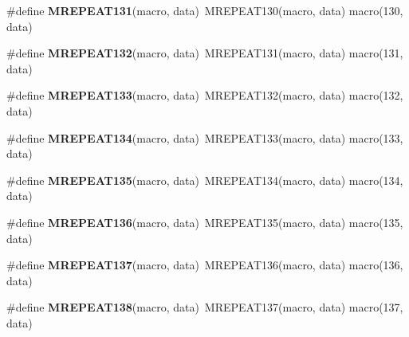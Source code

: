 \begin{DoxyCompactItemize}
\item 
\hypertarget{group__group__xmega__utils__mrepeat_ga6171f95e704d4bc6b92bca58bf15445c}{\#define {\bfseries M\-R\-E\-P\-E\-A\-T131}(macro, data)~M\-R\-E\-P\-E\-A\-T130(macro, data)   macro(130, data)}\label{group__group__xmega__utils__mrepeat_ga6171f95e704d4bc6b92bca58bf15445c}

\item 
\hypertarget{group__group__xmega__utils__mrepeat_ga70b3e029b2ca5370d287a710ba66cba3}{\#define {\bfseries M\-R\-E\-P\-E\-A\-T132}(macro, data)~M\-R\-E\-P\-E\-A\-T131(macro, data)   macro(131, data)}\label{group__group__xmega__utils__mrepeat_ga70b3e029b2ca5370d287a710ba66cba3}

\item 
\hypertarget{group__group__xmega__utils__mrepeat_ga808576086998ab3ae33981a5b7a28c4c}{\#define {\bfseries M\-R\-E\-P\-E\-A\-T133}(macro, data)~M\-R\-E\-P\-E\-A\-T132(macro, data)   macro(132, data)}\label{group__group__xmega__utils__mrepeat_ga808576086998ab3ae33981a5b7a28c4c}

\item 
\hypertarget{group__group__xmega__utils__mrepeat_gad697f86f8799147acde4ca488f87b446}{\#define {\bfseries M\-R\-E\-P\-E\-A\-T134}(macro, data)~M\-R\-E\-P\-E\-A\-T133(macro, data)   macro(133, data)}\label{group__group__xmega__utils__mrepeat_gad697f86f8799147acde4ca488f87b446}

\item 
\hypertarget{group__group__xmega__utils__mrepeat_ga34c93ca93d79b5955fda5a08fd758e22}{\#define {\bfseries M\-R\-E\-P\-E\-A\-T135}(macro, data)~M\-R\-E\-P\-E\-A\-T134(macro, data)   macro(134, data)}\label{group__group__xmega__utils__mrepeat_ga34c93ca93d79b5955fda5a08fd758e22}

\item 
\hypertarget{group__group__xmega__utils__mrepeat_ga57d2b47fe36fbbfeb3dc2d4d7aefaeb1}{\#define {\bfseries M\-R\-E\-P\-E\-A\-T136}(macro, data)~M\-R\-E\-P\-E\-A\-T135(macro, data)   macro(135, data)}\label{group__group__xmega__utils__mrepeat_ga57d2b47fe36fbbfeb3dc2d4d7aefaeb1}

\item 
\hypertarget{group__group__xmega__utils__mrepeat_gaea5f05e5377ed7f7628b6b5bba397523}{\#define {\bfseries M\-R\-E\-P\-E\-A\-T137}(macro, data)~M\-R\-E\-P\-E\-A\-T136(macro, data)   macro(136, data)}\label{group__group__xmega__utils__mrepeat_gaea5f05e5377ed7f7628b6b5bba397523}

\item 
\hypertarget{group__group__xmega__utils__mrepeat_ga26e5d13baa4707214f4782d3acc0f231}{\#define {\bfseries M\-R\-E\-P\-E\-A\-T138}(macro, data)~M\-R\-E\-P\-E\-A\-T137(macro, data)   macro(137, data)}\label{group__group__xmega__utils__mrepeat_ga26e5d13baa4707214f4782d3acc0f231}


\end{DoxyCompactItemize}
